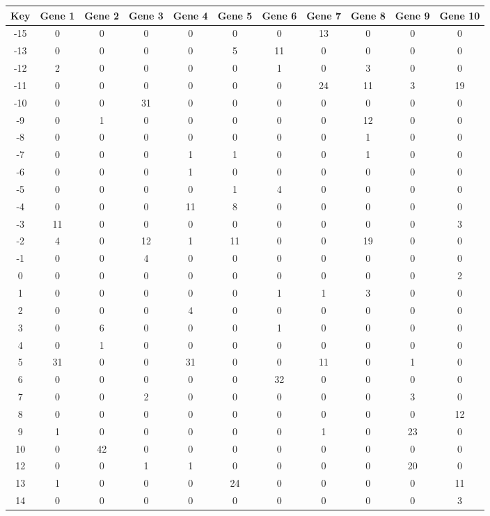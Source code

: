 \begin{tabular}{|c|c|c|c|c|c|c|c|c|c|c|}
\hline
Key & Gene 1 & Gene 2 & Gene 3 & Gene 4 & Gene 5 & Gene 6 & Gene 7 & Gene 8 & Gene 9 & Gene 10 \\
\hline
-15 & 0 & 0 & 0 & 0 & 0 & 0 & 13 & 0 & 0 & 0 \\
-13 & 0 & 0 & 0 & 0 & 5 & 11 & 0 & 0 & 0 & 0 \\
-12 & 2 & 0 & 0 & 0 & 0 & 1 & 0 & 3 & 0 & 0 \\
-11 & 0 & 0 & 0 & 0 & 0 & 0 & 24 & 11 & 3 & 19 \\
-10 & 0 & 0 & 31 & 0 & 0 & 0 & 0 & 0 & 0 & 0 \\
-9 & 0 & 1 & 0 & 0 & 0 & 0 & 0 & 12 & 0 & 0 \\
-8 & 0 & 0 & 0 & 0 & 0 & 0 & 0 & 1 & 0 & 0 \\
-7 & 0 & 0 & 0 & 1 & 1 & 0 & 0 & 1 & 0 & 0 \\
-6 & 0 & 0 & 0 & 1 & 0 & 0 & 0 & 0 & 0 & 0 \\
-5 & 0 & 0 & 0 & 0 & 1 & 4 & 0 & 0 & 0 & 0 \\
-4 & 0 & 0 & 0 & 11 & 8 & 0 & 0 & 0 & 0 & 0 \\
-3 & 11 & 0 & 0 & 0 & 0 & 0 & 0 & 0 & 0 & 3 \\
-2 & 4 & 0 & 12 & 1 & 11 & 0 & 0 & 19 & 0 & 0 \\
-1 & 0 & 0 & 4 & 0 & 0 & 0 & 0 & 0 & 0 & 0 \\
0 & 0 & 0 & 0 & 0 & 0 & 0 & 0 & 0 & 0 & 2 \\
1 & 0 & 0 & 0 & 0 & 0 & 1 & 1 & 3 & 0 & 0 \\
2 & 0 & 0 & 0 & 4 & 0 & 0 & 0 & 0 & 0 & 0 \\
3 & 0 & 6 & 0 & 0 & 0 & 1 & 0 & 0 & 0 & 0 \\
4 & 0 & 1 & 0 & 0 & 0 & 0 & 0 & 0 & 0 & 0 \\
5 & 31 & 0 & 0 & 31 & 0 & 0 & 11 & 0 & 1 & 0 \\
6 & 0 & 0 & 0 & 0 & 0 & 32 & 0 & 0 & 0 & 0 \\
7 & 0 & 0 & 2 & 0 & 0 & 0 & 0 & 0 & 3 & 0 \\
8 & 0 & 0 & 0 & 0 & 0 & 0 & 0 & 0 & 0 & 12 \\
9 & 1 & 0 & 0 & 0 & 0 & 0 & 1 & 0 & 23 & 0 \\
10 & 0 & 42 & 0 & 0 & 0 & 0 & 0 & 0 & 0 & 0 \\
12 & 0 & 0 & 1 & 1 & 0 & 0 & 0 & 0 & 20 & 0 \\
13 & 1 & 0 & 0 & 0 & 24 & 0 & 0 & 0 & 0 & 11 \\
14 & 0 & 0 & 0 & 0 & 0 & 0 & 0 & 0 & 0 & 3 \\
\hline
\end{tabular}
